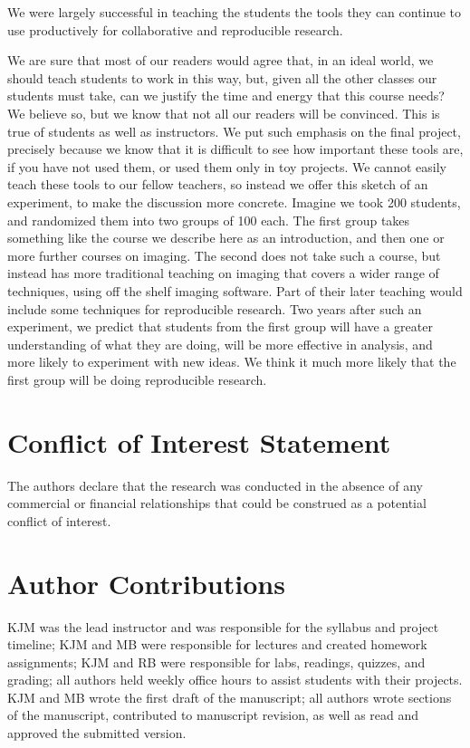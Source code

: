 We were largely successful in teaching the students the tools they can continue
to use productively for collaborative and reproducible research.

We are sure that most of our readers would agree that, in an ideal world, we
should teach students to work in this way, but, given all the other
classes our students must take, can we justify the time and energy that this
course needs?  We believe so, but we know that not all our readers will be
convinced.  This is true of students as well as
instructors.  We put such emphasis on the final project, precisely because we
know that it is difficult to see how important these tools are, if you
have not used them, or used them only in toy projects.  We cannot easily teach
these tools to our fellow teachers, so instead we offer this sketch of an
experiment, to make the discussion more concrete.  Imagine we took 200
students, and randomized them into two groups of 100 each.  The first group
takes something like the course we describe here as an introduction, and then
one or more further courses on imaging.  The second does not take such a
course, but instead has more traditional teaching on imaging that covers a
wider range of techniques, using off the shelf imaging software.  Part of
their later teaching would include some techniques for reproducible research.
Two years after such an experiment, we predict that
students from the first group will have a greater understanding of what they
are doing, will be more effective in analysis, and more likely to
experiment with new ideas.  We think it much more likely that the first group
will be doing reproducible research.

\section*{Conflict of Interest Statement}

The authors declare that the research was conducted in the absence of any
commercial or financial relationships that could be construed as a potential
conflict of interest.

\section*{Author Contributions}

KJM was the lead instructor and was responsible for the syllabus and project timeline;
KJM and MB were responsible for lectures and created homework assignments;
KJM and RB were responsible for labs, readings, quizzes, and grading;
all authors held weekly office hours to assist students with their projects.
KJM and MB wrote the first draft of the manuscript;
all authors wrote sections of the manuscript, contributed to manuscript revision, 
as well as read and approved the submitted version.
